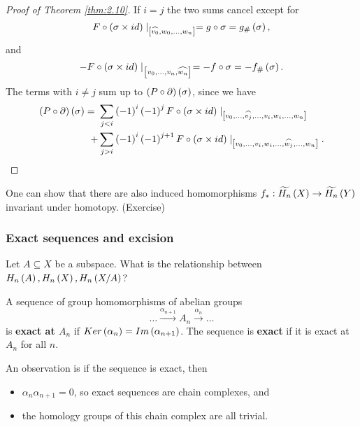 \begin{proof}[Proof of Theorem \ref{thm:2.10}]
If $ i = j $ the two sums cancel except for
$$ F \circ \left( \sigma \times id \right) \mid_{\left[ \widehat{v_0}, w_0, \dots, w_n \right]} = g \circ \sigma = g_\#\left( \sigma \right), $$
and
$$ -F \circ \left( \sigma \times id \right) \mid_{\left[ v_0, \dots, v_n, \widehat{w_n} \right]} = -f \circ \sigma = -f_\#\left( \sigma \right). $$
The terms with $ i \ne j $ sum up to $ \left( P \circ \partial \right)\left( \sigma \right) $, since we have
\begin{align*}
\left( P \circ \partial \right)\left( \sigma \right)
= \ & \sum_{j < i} \left( -1 \right)^i\left( -1 \right)^jF \circ \left( \sigma \times id \right) \mid_{\left[ v_0, \dots, \widehat{v_j}, \dots, v_i, w_i, \dots, w_n \right]} \\
+ & \sum_{j > i} \left( -1 \right)^i\left( -1 \right)^{j + 1}F \circ \left( \sigma \times id \right) \mid_{\left[ v_0, \dots, v_i, w_i, \dots, \widehat{w_j}, \dots, w_n \right]}.
\end{align*}
\end{proof}


\begin{remark*}
One can show that there are also induced homomorphisms $ f_* : \widetilde{H_n}\left( X \right) \to \widetilde{H_n}\left( Y \right) $ invariant under homotopy. (Exercise)
\end{remark*}

\subsubsection{Exact sequences and excision}

Let $ A \subseteq X $ be a subspace. What is the relationship between $ H_n\left( A \right), H_n\left( X \right), H_n\left( X / A \right) $?

\begin{definition*}
A sequence of group homomorphisms of abelian groups
$$ \dots \xrightarrow{\alpha_{n + 1}} A_n \xrightarrow{\alpha_n} \dots $$
is \textbf{exact at $ A_n $} if $ Ker\left( \alpha_n \right) = Im\left( \alpha_{n + 1} \right) $. The sequence is \textbf{exact} if it is exact at $ A_n $ for all $ n $.
\end{definition*}

An observation is if the sequence is exact, then
\begin{itemize}
\item $ \alpha_n\alpha_{n + 1} = 0 $, so exact sequences are chain complexes, and
\item the homology groups of this chain complex are all trivial.
\end{itemize}

